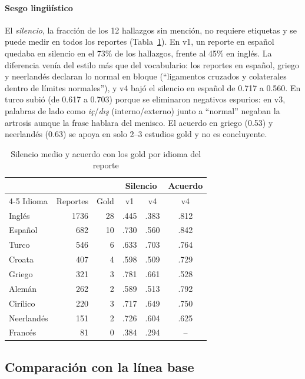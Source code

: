 \documentclass[conference]{IEEEtran}
\begin{document}
\paragraph*{Sesgo lingüístico}
El \emph{silencio}, la fracción de los 12 hallazgos sin mención, no requiere etiquetas y se puede medir en todos los reportes (Tabla~\ref{tab:ext-idioma}).
En v1, un reporte en español quedaba en silencio en el 73\% de los hallazgos, frente al 45\% en inglés.
La diferencia venía del estilo más que del vocabulario: los reportes en español, griego y neerlandés declaran lo normal en bloque (``ligamentos cruzados y colaterales dentro de límites normales''), y v4 bajó el silencio en español de 0.717 a 0.560.
En turco subió (de 0.617 a 0.703) porque se eliminaron negativos espurios: en v3, palabras de lado como \emph{iç}/\emph{d{\i}{\c{s}}} (interno/externo) junto a ``normal'' negaban la artrosis aunque la frase hablara del menisco.
El acuerdo en griego (0.53) y neerlandés (0.63) se apoya en solo 2--3 estudios gold y no es concluyente.

\begin{table}[t]
  \caption{Silencio medio y acuerdo con los gold por idioma del reporte}
  \label{tab:ext-idioma}
  \centering
  \footnotesize
  \begin{tabular}{@{}lrrccc@{}}
    \toprule
    & & & \multicolumn{2}{c}{Silencio} & Acuerdo \\
    \cmidrule(lr){4-5}
    Idioma & Reportes & Gold & v1 & v4 & v4 \\
    \midrule
    Inglés     & 1736 & 28 & .445 & .383 & .812 \\
    Español    &  682 & 10 & .730 & .560 & .842 \\
    Turco      &  546 &  6 & .633 & .703 & .764 \\
    Croata     &  407 &  4 & .598 & .509 & .729 \\
    Griego     &  321 &  3 & .781 & .661 & .528 \\
    Alemán     &  262 &  2 & .589 & .513 & .792 \\
    Cirílico   &  220 &  3 & .717 & .649 & .750 \\
    Neerlandés &  151 &  2 & .726 & .604 & .625 \\
    Francés    &   81 &  0 & .384 & .294 & --   \\
    \bottomrule
  \end{tabular}
\end{table}

\subsection{Comparación con la línea base}
\label{sec:res-base}
\end{document}
